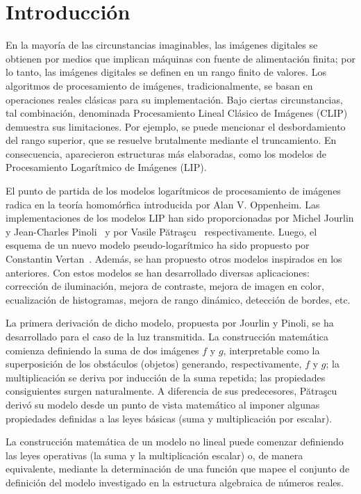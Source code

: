 \chapter*{Introducción}\label{chapter:introduction}

En la mayoría de las circunstancias imaginables, las imágenes digitales se obtienen por medios que implican máquinas con fuente de alimentación finita; por lo tanto, las imágenes digitales se definen en un rango finito de valores. Los algoritmos de procesamiento de imágenes, tradicionalmente, se basan en operaciones reales clásicas para su implementación. Bajo ciertas circunstancias, tal combinación, denominada Procesamiento Lineal Clásico de Imágenes (CLIP) demuestra sus limitaciones. Por ejemplo, se puede mencionar el desbordamiento del rango superior, que se resuelve brutalmente mediante el truncamiento. En consecuencia, aparecieron estructuras más elaboradas, como los modelos de Procesamiento Logarítmico de Imágenes (LIP).

El punto de partida de los modelos logarítmicos de procesamiento de imágenes radica en la teoría homomórfica introducida por Alan V. Oppenheim. Las implementaciones de los modelos LIP han sido proporcionadas por Michel Jourlin y Jean-Charles Pinoli~\cite{jourlin1988model} y por Vasile Pătraşcu~\cite{patrascu2014mathematical} respectivamente. Luego, el esquema de un nuevo modelo pseudo-logarítmico ha sido propuesto por Constantin Vertan~\cite{vertan2008pseudo}. Adem\'as, se han propuesto otros modelos inspirados en los anteriores. Con estos modelos se han desarrollado diversas aplicaciones: corrección de iluminación, mejora de contraste, mejora de imagen en color, ecualización de histogramas, mejora de rango dinámico, detección de bordes, etc.

La primera derivación de dicho modelo, propuesta por Jourlin y Pinoli, se ha desarrollado para el caso de la luz transmitida. La construcción matemática comienza definiendo la suma de dos imágenes $f$ y $g$, interpretable como la superposición de los obstáculos (objetos) generando, respectivamente, $f$ y $g$; la multiplicación se deriva por inducción de la suma repetida; las propiedades consiguientes surgen naturalmente. A diferencia de sus predecesores, Pătraşcu derivó su modelo desde un punto de vista matemático al imponer algunas propiedades definidas a las leyes básicas (suma y multiplicación por escalar).

La construcción matemática de un modelo no lineal puede comenzar definiendo las leyes operativas (la suma y la multiplicación escalar) o, de manera equivalente, mediante la determinación de una función que mapee el conjunto de definición del modelo investigado en la estructura algebraica de números reales.

